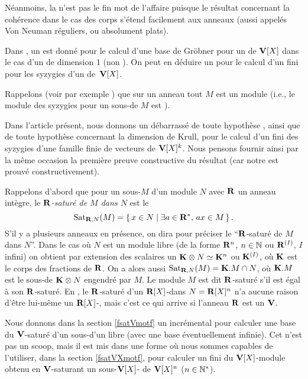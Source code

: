 Néanmoins, la \noet n'est pas le fin mot de l'affaire puisque
le résultat concernant la cohérence dans le cas des corps s'étend facilement aux anneaux \zedrs
(aussi appelés Von Neuman réguliers, ou absolument plats).

 

Dans \citealt*{fLSY}, un \algo est donné pour le calcul d'une base de Gr\"obner
pour un \itf de $\mathbf{V}[X]$ dans le cas  d'un \ddv de dimension 1
(non \ncrt \noe).
On peut en déduire un \algo pour le calcul d'un  \sgr fini pour les syzygies d'un \itf de~$\mathbf{V}[X]$.

Rappelons (voir par exemple \citealt*{fMRR}) que sur un anneau \coh tout \mpf $M$ est un module \coh
(i.e., le module des syzygies pour un sous-\mtf de $M$ est \tf).


Dans l'article présent, nous donnons un \algo débarrassé de toute hypothèse \noee, ainsi que de toute hypothèse concernant la dimension de Krull, 
pour  le calcul
d'un \sgr fini des syzygies d'une famille 
finie de vecteurs de $\mathbf{V}[X]^k$.
Nous pensons fournir ainsi
par la m\^eme occasion la première preuve constructive du résultat
(car notre \algo est prouvé constructivement).

Rappelons d'abord que pour un sous-\Rmo $M$ d'un module $N$ avec $\mathbf{R}$
un anneau intègre, le \textsl{$\mathbf{R}$-saturé de $M$ dans $N$} est le \Rmo 
$$\mathrm{Sat}_{\mathbf{R},N}(M)=\left\{{\,x\in N\mid\exists a\in \mathbf{R}^*,\,ax\in M\,}\right\}.$$
S'il y a plusieurs anneaux en présence, on dira pour préciser le ``$\mathbf{R}$-saturé de $M$ dans $N$''.
 Dans le cas où $N$ 
est un module libre (de la forme $\mathbf{R}^n $, $n\in \mathbb{N}$ ou $\mathbf{R}^{(I)}$, $I$ infini)
on obtient par extension des scalaires un \Kev $\mathbf{K}\otimes N\simeq\mathbf{K}^n $ ou $\mathbf{K}^{(I)}$, où $\mathbf{K}$ est le corps des fractions de $\mathbf{R}$. On a alors aussi  $\mathrm{Sat}_{\mathbf{R},N}(M)=\mathbf{K}.M\cap N$,
où  $\mathbf{K}.M$ est le sous-\Kev de $\mathbf{K}\otimes N$  engendré par $M$.
Le module $M$ est dit  $\mathbf{R}$-saturé s'il est égal à son $\mathbf{R}$-saturé.
En \gnl, le $\mathbf{R}$-saturé d'un $\mathbf{R}[X]$-\mtf dans $N=\mathbf{R}[X]^n $ n'a aucune raison d'\^etre lui-m\^eme un  $\mathbf{R}[X]$-\mtf,
mais c'est ce qui arrive si l'anneau $\mathbf{R}$ est  un \ddv $\mathbf{V}$.
 
Nous donnons dans la section \ref{fsatVmotf} un \algo incrémental pour calculer une base du $\mathbf{V}$-saturé 
d'un sous-\mtf d'un \Vmo libre (avec une base éventuellement infinie).
Cet \algo n'est pas un scoop, mais il est mis dans une forme où 
nous sommes capables de l'utiliser, dans la section \ref{fsatVXmotf}, pour calculer un \sgr fini du $\mathbf{V}[X]$-module obtenu en $\mathbf{V}$-saturant un sous-$\mathbf{V}[X]$-\mtf
de $\mathbf{V}[X]^n$ ($n\in \mathbb{N}^*$). 

